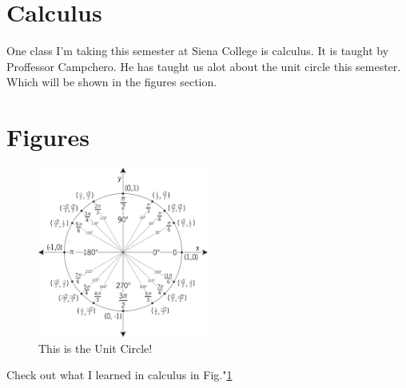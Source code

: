 \documentclass[twocolumn]{revtex4}
\begin{document}
\section{Calculus}
One class I'm taking this semester at Siena College is calculus.  It is taught by Proffessor Campchero.  He has taught us alot about the unit circle this semester.  Which will be shown in the figures section.
\section{Figures}

\begin{figure}[h]
	\centering
	\includegraphics[width = 0.5\textwidth]{unitcircle.png}
	\caption{This is the Unit Circle! \label{Unit Circle}}


\end{figure}

Check out what I learned in calculus in Fig."\ref{Unit Circle}

\end{document}
